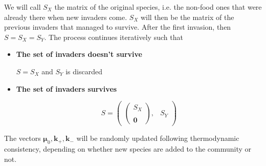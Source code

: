 \documentclass{article}
\begin{document}
We will call $S_X$ the matrix of the original species, i.e. the non-food ones that were already there when new invaders come. $S_X$ will then be the matrix of the previous invaders that managed to survive. After the first invasion, then $S=S_X=S_Y$. The process continues iteratively such that

\begin{itemize}
    \item \textbf{The set of invaders doesn't survive}
    \begin{center}
    $S=S_X$ and $S_Y$ is discarded
    \end{center}
      \item \textbf{The set of invaders survives}   
\begin{center}
\begin{equation}
    S = \begin{pmatrix}
        \begin{pmatrix}
            S_X \\ \\
            \pmb{0}
        \end{pmatrix}, & S_Y
    \end{pmatrix}
\end{equation}
\end{center}
        \end{itemize}


The vectors $\pmb{\mu}_0, \pmb{k}_+, \pmb{k}_-$ will be randomly updated following thermodynamic consistency, depending on whether new species are added to the community or not.

\\
\end{document}
